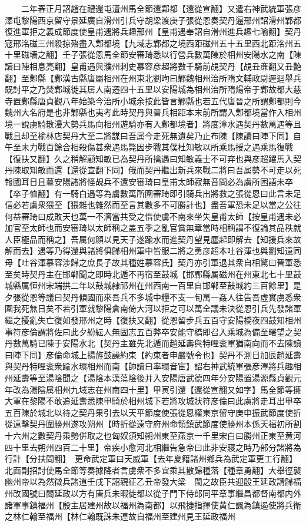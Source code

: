　　二年春正月詔趙在禮還屯澶州馬全節還鄴都【還從宣翻】又遣右神武統軍張彦澤屯黎陽西京留守景延廣自滑州引兵守胡梁渡庚子張從恩奏契丹逼邢州詔滑州鄴都復進軍拒之義成節度使皇甫遇將兵趣邢州【皇甫遇奉詔自滑州進兵趣七喻翻】契丹寇邢洺磁三州殺掠殆盡入鄴都境【九域志鄴都之境西距磁州五十五里西北距洺州五十里磁墻之翻】壬子張從恩馬全節安審琦悉以行營兵數萬陳於相州安陽水之南【陳讀曰陣相息亮翻】皇甫遇與濮州刺史慕容彦超將數千騎前覘契丹【覘丑亷翻又丑艶翻】至鄴縣【鄴漢古縣唐屬相州在州東北劉昫曰鄴魏相州治所隋文輔政尉遲迴舉兵既討平之乃焚鄴城徙其居人南遷四十五里以安陽城為相州治所隋煬帝于鄴故都大慈寺置鄴縣唐貞觀八年始築今治所小城余按此皆言鄴縣也若五代唐晉之所謂鄴都則今魏州大名府是也非鄴縣也夷考此時契丹與晉兵相距本末前所謂入鄴都境當作入相州境一說虜騎散漫大勢兵馬向相州遊騎亦有入鄴都境者】將度漳水遇契丹數萬遇等且戰且却至榆林店契丹大至二將謀曰吾属今走死無遺矣乃止布陳【陳讀曰陣下同】自午至未力戰百餘合相殺傷甚衆遇馬斃因步戰其僕杜知敏以所乘馬授之遇乘馬復戰【復扶又翻】久之稍解顧知敏已為契丹所擒遇曰知敏義士不可弃也與彦超躍馬入契丹陳取知敏而還【還從宣翻下同】俄而契丹繼出新兵來戰二將曰吾属勢不可走以死報國耳日且暮安陽諸將怪覘兵不還安審琦曰皇甫太師寂無音問必為虜所困語未卒【卒子恤翻】有一騎白遇等為虜數萬所圍審琦即引騎兵出將救之張從恩曰此言未足信必若虜衆猥至【猥雜也雜然而至言其數多不可勝計也】盡吾軍恐未足以當之公往何益審琦曰成敗天也萬一不濟當共受之借使虜不南來坐失皇甫太師【按皇甫遇未必加官至太師也而安審琦以太師稱之盖五季之亂官賞無章當時相稱謂不復論其品秩就人臣極品而稱之】吾属何顔以見天子遂踰水而進契丹望見塵起即解去【知援兵來故解而去】遇等乃得還與諸將俱歸相州軍中皆服二將之勇彦超本吐谷渾也與劉知遠同母【吐谷渾慕容涉歸之庶長子故其種姓慕容氏】契丹亦引軍退其衆自相驚曰晉軍悉至矣時契丹主在邯郸聞之即時北遁不再宿至鼓城【邯鄲縣属磁州在州東北七十里鼓城縣属恒州宋端拱二年以鼓城隸祁州在州西南一百里自邯郸至鼔城約三百餘里】是夕張從恩等議曰契丹傾國而來吾兵不多城中糧不支一旬萬一姦人往告吾虛實虜悉衆圍我死無日矣不若引軍就黎陽倉南倚大河以拒之可以萬全議未決從恩引兵先發諸軍繼之擾亂失亡復如發邢州之時【復扶又翻】從恩留步兵五百守安陽橋夜四鼓知相州事符彦倫謂將佐曰此夕紛紜人無固志五百弊卒安能守橋即召入乘城為備至曙望之契丹數萬騎已陳于安陽水北【契丹主雖先北遁而趙延夀與特哩衮軍猶南向而不去陳讀曰陣下同】彦倫命城上揚旌鼓譟約束【約束者申嚴號令也】契丹不測日加辰趙延壽與契丹特哩衮衆踰水環相州而南【帥讀曰率環音宦】詔右神武統軍張彦澤將兵趣相州延壽等至湯陰聞之【湯陰本漢蕩陰後并入安陽唐武德四年分安陽置湯源縣貞觀元年改為湯陰属相州九域志在州南四十里】甲寅引還【還從宣翻又如字】馬全節等擁大軍在黎陽不敢追延夀悉陳甲騎於相州城下若將攻城狀符彦倫曰此虜將走耳出甲卒五百陳於城北以待之契丹果引去以天平節度使張從恩權東京留守庚申振武節度使折從遠擊契丹圍勝州遂攻朔州【時折從遠守府州命領鎮武節度使勝州本係天福初所割十六州之數契丹乘勢併取之也匈奴須知朔州東至燕京一千里宋白曰勝州正東至黄河四十里去朔州四百二十里】帝疾小愈河北相繼告急帝曰此非安寢之時乃部分諸將為行計【分扶問翻】　更命武定軍曰天威軍【去年夏籍諸州鄉兵為武定軍更工行翻】　北面副招討使馬全節等奏據降者言虜衆不多宜乘其散歸種落【種章勇翻】大舉徑襲幽州帝以為然徵兵諸道壬戌下詔親征乙丑帝發大梁　閩之故臣共迎殷王延政請歸福州改國號曰閩延政以方有唐兵未暇徙都以從子門下侍郎同平章事繼昌都督南都内外諸軍事鎮福州【殷主居建州故以福州為南都】以飛捷指揮使黄仁諷為鎮遏使將兵衛之林仁翰至福州【林仁翰既誅朱連故自福州至建州見王延政福州
